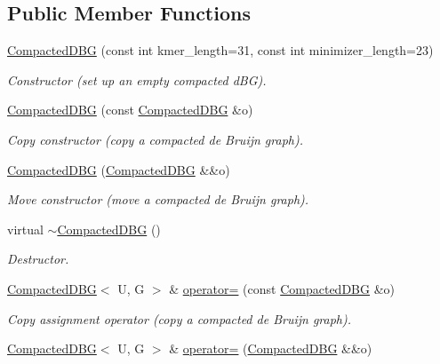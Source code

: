 \subsection*{Public Member Functions}
\begin{DoxyCompactItemize}
\item 
\hyperlink{classCompactedDBG_ad6584f016b02651312c69ac444349bfe}{Compacted\+D\+BG} (const int kmer\+\_\+length=31, const int minimizer\+\_\+length=23)
\begin{DoxyCompactList}\small\item\em Constructor (set up an empty compacted d\+BG). \end{DoxyCompactList}\item 
\hyperlink{classCompactedDBG_a84fbb8da0cf47e8cdf9cb60fb2eab0f0}{Compacted\+D\+BG} (const \hyperlink{classCompactedDBG}{Compacted\+D\+BG} \&o)
\begin{DoxyCompactList}\small\item\em Copy constructor (copy a compacted de Bruijn graph). \end{DoxyCompactList}\item 
\hyperlink{classCompactedDBG_ac93c3355910670b8244741b22baca929}{Compacted\+D\+BG} (\hyperlink{classCompactedDBG}{Compacted\+D\+BG} \&\&o)
\begin{DoxyCompactList}\small\item\em Move constructor (move a compacted de Bruijn graph). \end{DoxyCompactList}\item 
\mbox{\label{classCompactedDBG_a64299c748d198a2596facfd39c2bd280}} 
virtual \hyperlink{classCompactedDBG_a64299c748d198a2596facfd39c2bd280}{$\sim$\+Compacted\+D\+BG} ()
\begin{DoxyCompactList}\small\item\em Destructor. \end{DoxyCompactList}\item 
\hyperlink{classCompactedDBG}{Compacted\+D\+BG}$<$ U, G $>$ \& \hyperlink{classCompactedDBG_a0c7e50223cdcb178110aa49e983e4ec2}{operator=} (const \hyperlink{classCompactedDBG}{Compacted\+D\+BG} \&o)
\begin{DoxyCompactList}\small\item\em Copy assignment operator (copy a compacted de Bruijn graph). \end{DoxyCompactList}\item 
\hyperlink{classCompactedDBG}{Compacted\+D\+BG}$<$ U, G $>$ \& \hyperlink{classCompactedDBG_a191a4cce892c9a6ceea7bfdfbf41e494}{operator=} (\hyperlink{classCompactedDBG}{Compacted\+D\+BG} \&\&o)

\end{DoxyCompactItemize}
